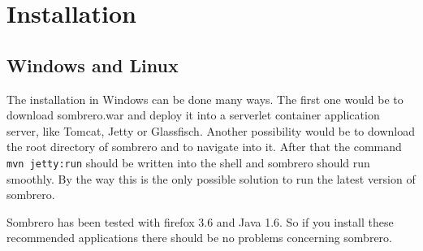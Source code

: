 \section{Installation}
\subsection{Windows and Linux}
The installation in Windows can be done many ways. The first one would be to download sombrero.war and deploy it into a serverlet container application server, like Tomcat, Jetty or Glassfisch. Another possibility would be to download the root directory of sombrero and to navigate into it. After that the command \lstinline!mvn jetty:run! should be written into the shell and sombrero should run smoothly. By the way this is the only possible solution to run the latest version of sombrero.

Sombrero has been tested with firefox 3.6 and Java 1.6. So if you install these recommended applications there should be no problems concerning sombrero.
